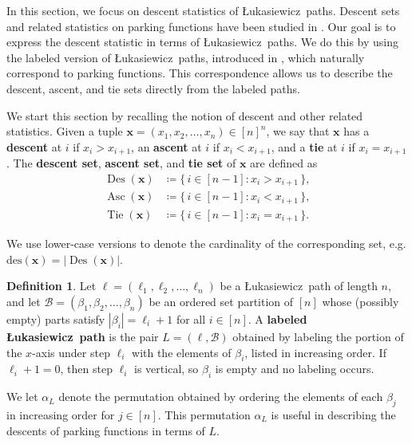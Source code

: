 \documentclass[12pt,reqno]{amsart}
\theoremstyle{definition}
\newtheorem{definition}{Definition}
\theoremstyle{remark}
\newcommand{\x}{\textbf{x}}
\newcommand{\des}{\mathrm{des}}
\DeclareMathOperator{\Des}{Des}
\DeclareMathOperator{\Asc}{Asc}
\DeclareMathOperator{\Tie}{Tie}
\newcommand{\Luka}{\L ukasiewicz}
\newcommand{\defterm}{\textbf}
\begin{document}
In this section, we focus on descent statistics of \Luka~paths.  Descent sets and related statistics on parking functions have been studied in \cite{inversions, harris2024parkingfunctionsfixedset, Schumacher, pfstats}. Our goal is to express the descent statistic in terms of \Luka~paths. We do this by using the labeled version of \Luka~paths, introduced in \cite{SZ},
which naturally correspond to parking functions. This correspondence allows us to describe the descent, ascent, and tie sets directly from the labeled paths. 

We start this section by recalling the notion of descent and other related statistics. Given a tuple $\x = (x_1, x_2, \ldots, x_n) \in [n]^n$,  
we say that $\x$ has a \defterm{descent} at $i$ if $x_i > x_{i+1}$,  
an \defterm{ascent} at $i$ if $x_i < x_{i+1}$,  
and a \defterm{tie} at $i$ if $x_i = x_{i+1}$.  
The \defterm{descent set}, \defterm{ascent set}, and \defterm{tie set} of $\x$ are defined as
\begin{align*}
    \Des(\x) &\coloneqq \{\, i \in [n-1] : x_i > x_{i+1} \,\}, \\
    \Asc(\x) &\coloneqq \{\, i \in [n-1] : x_i < x_{i+1} \,\}, \\
    \Tie(\x) &\coloneqq \{\, i \in [n-1] : x_i = x_{i+1} \,\}.
\end{align*}

We use lower-case versions to denote the cardinality of the corresponding set, e.g. $\des(\x)=|\Des(\x)|.$



\begin{definition}\label{def:labeled_Luka}
    Let $\ell = (\ell_1, \ell_2, \ldots, \ell_n)$ be a \Luka~path of length $n$,  
    and let $\mathcal{B} = (\beta_1, \beta_2, \ldots, \beta_n)$ be an ordered set partition of $[n]$  
    whose (possibly empty) parts satisfy $|\beta_i| = \ell_i + 1$ for all $i \in [n]$.  
    A \defterm{labeled \Luka~path} is the pair $L = (\ell, \mathcal{B})$ obtained by labeling  
    the portion of the $x$-axis under step $\ell_i$ with the elements of $\beta_i$,  
    listed in increasing order.   If $\ell_i + 1 = 0$, then step $\ell_i$ is vertical, so $\beta_i$ is empty and no labeling occurs.  


    We let $\alpha_L$ denote the permutation obtained by ordering the elements of each $\beta_j$ in increasing order for $j \in [n]$. This permutation $\alpha_L$ is useful in describing the descents of parking functions in terms of $L$.
\end{definition}
\end{document}
